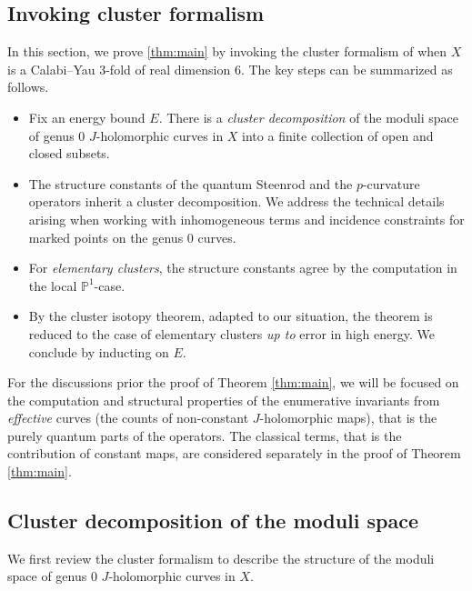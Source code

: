 \documentclass[reqno]{amsart}
\numberwithin{equation}{section}
\numberwithin{equation}{section}
\numberwithin{equation}{section}
\theoremstyle{definition}
\theoremstyle{remark}
\theoremstyle{remark}
\begin{document}
\subsection{Invoking cluster formalism}\label{ssec:clusters}

In this section, we prove \cref{thm:main} by invoking the cluster formalism of \cite{IP-GV} when $X$ is a Calabi--Yau 3-fold of real dimension $6$. The key steps can be summarized as follows.

\begin{itemize}
    \item Fix an energy bound $E$. There is a \emph{cluster decomposition} of the moduli space of genus $0$ $J$-holomorphic curves in $X$ into a finite collection of open and closed subsets.
    \item The structure constants of the quantum Steenrod and the $p$-curvature operators inherit a cluster decomposition. We address the technical details arising when working with inhomogeneous terms and incidence constraints for marked points on the genus $0$ curves.
    \item For \emph{elementary clusters}, the structure constants agree by the computation in the local $\mathbb{P}^1$-case.
    \item By the cluster isotopy theorem, adapted to our situation, the theorem is reduced to the case of elementary clusters \emph{up to} error in high energy. We conclude by inducting on $E$.
\end{itemize}

For the discussions prior the proof of Theorem \ref{thm:main}, we will be focused on the computation and structural properties of the enumerative invariants from \emph{effective} curves (the counts of non-constant $J$-holomorphic maps), that is the purely quantum parts of the operators. The classical terms, that is the contribution of constant maps, are considered separately in the proof of Theorem \ref{thm:main}.

\subsection{Cluster decomposition of the moduli space}
We first review the cluster formalism to describe the structure of the moduli space of genus $0$ $J$-holomorphic curves in $X$. 
\end{document}
